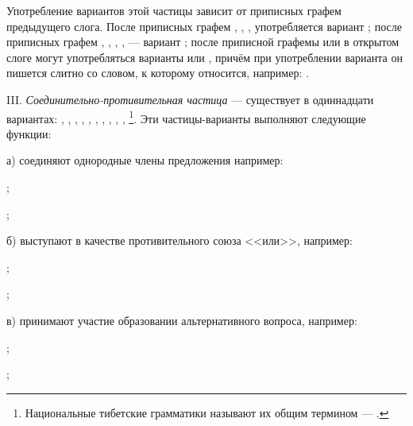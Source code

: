 Употребление вариантов этой частицы зависит от приписных графем предыдущего слога. После приписных графем , , ,  употребляется вариант ; после приписных графем , , , ,  --- вариант ; после приписной графемы  или в открытом слоге могут употребляться варианты  или , причём при употреблении варианта он пишется слитно со словом, к которому относится, например: .

III. \label{sec:ss:soed_protiv}\emph{Соединительно-противительная частица} --- существует в одиннадцати вариантах:
, , ,
, , ,
, , ,
, \footnote[49]{Национальные тибетские грамматики называют их общим термином --- .}.
Эти частицы-варианты выполняют следующие функции:

а) соединяют однородные члены предложения например:
\begin{prfsample}
	\item {};
	\item {};
\end{prfsample}

б) выступают в качестве противительного союза <<или>>, например:
\begin{prfsample}
	\item {};
	\item {};
\end{prfsample}

в) принимают участие образовании альтернативного вопроса, например:
\begin{prfsample}
	\item {};
	\item {};
\end{prfsample}

